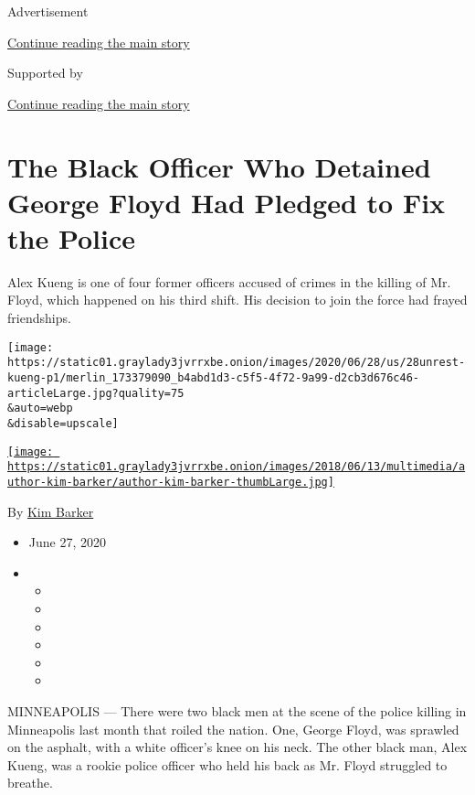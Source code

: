 Advertisement

\protect\hyperlink{after-top}{Continue reading the main story}

Supported by

\protect\hyperlink{after-sponsor}{Continue reading the main story}

\hypertarget{the-black-officer-who-detained-george-floyd-had-pledged-to-fix-the-police}{%
\section{The Black Officer Who Detained George Floyd Had Pledged to Fix
the
Police}\label{the-black-officer-who-detained-george-floyd-had-pledged-to-fix-the-police}}

Alex Kueng is one of four former officers accused of crimes in the
killing of Mr. Floyd, which happened on his third shift. His decision to
join the force had frayed friendships.

\texttt{[image: https://static01.graylady3jvrrxbe.onion/images/2020/06/28/us/28unrest-kueng-p1/merlin\_173379090\_b4abd1d3-c5f5-4f72-9a99-d2cb3d676c46-articleLarge.jpg?quality=75\\\&auto=webp\\\&disable=upscale]}

\href{https://www.nytimes3xbfgragh.onion/by/kim-barker}{\texttt{[image: https://static01.graylady3jvrrxbe.onion/images/2018/06/13/multimedia/author-kim-barker/author-kim-barker-thumbLarge.jpg]}}

By \href{https://www.nytimes3xbfgragh.onion/by/kim-barker}{Kim Barker}

\begin{itemize}
\item
  June 27, 2020
\item
  \begin{itemize}
  \item
  \item
  \item
  \item
  \item
  \item
  \end{itemize}
\end{itemize}

MINNEAPOLIS --- There were two black men at the scene of the police
killing in Minneapolis last month that roiled the nation. One, George
Floyd, was sprawled on the asphalt, with a white officer's knee on his
neck. The other black man, Alex Kueng, was a rookie police officer who
held his back as Mr. Floyd struggled to breathe.

